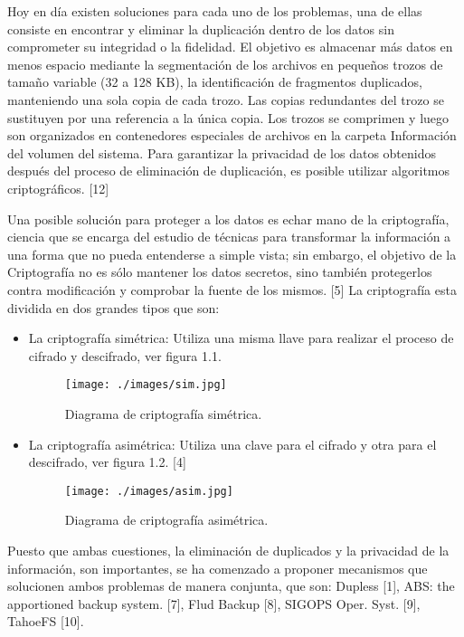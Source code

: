 Hoy en día existen soluciones para cada uno de los problemas, una de ellas consiste en encontrar y eliminar la duplicación dentro de los datos sin comprometer su integridad o la fidelidad. El objetivo es almacenar más datos en menos espacio mediante la segmentación de los archivos en pequeños trozos de tamaño variable (32 a 128 KB), la identificación de fragmentos duplicados, manteniendo una sola copia de cada trozo. Las copias redundantes del trozo se sustituyen por una referencia a la única copia. Los trozos se comprimen y luego son organizados en contenedores especiales de archivos en la carpeta Información del volumen del sistema. Para garantizar la privacidad de los datos obtenidos después del proceso de eliminación de duplicación, es posible utilizar algoritmos criptográficos. [12]

Una posible solución para proteger a los datos es echar mano de la criptografía, ciencia que se encarga del estudio de técnicas para transformar la información a una forma que no pueda entenderse a simple vista; sin embargo, el objetivo de la Criptografía no es sólo mantener los datos secretos, sino también protegerlos contra modificación y comprobar la fuente de los mismos. [5] La criptografía esta dividida en dos grandes tipos que son:

\begin{itemize}
	\item La criptografía simétrica: Utiliza una misma llave para realizar el proceso de cifrado y descifrado, ver figura 1.1.
		\begin{figure}[H]
			\centering
			\texttt{[image: ./images/sim.jpg]}
			\caption{Diagrama de criptografía simétrica.}
		\end{figure}
	\item La criptografía asimétrica: Utiliza una clave para el cifrado y otra para el descifrado, ver figura 1.2. [4]
		\begin{figure}[H]
			\centering
			\texttt{[image: ./images/asim.jpg]}
			\caption{Diagrama de criptografía asimétrica.}
		\end{figure}
\end{itemize}

Puesto que ambas cuestiones, la eliminación de duplicados y la privacidad de la información, son importantes, se ha comenzado a
proponer mecanismos que solucionen ambos problemas de manera conjunta, que son: Dupless [1], ABS: the apportioned backup
system. [7], Flud Backup [8], SIGOPS Oper. Syst. [9], TahoeFS [10].


